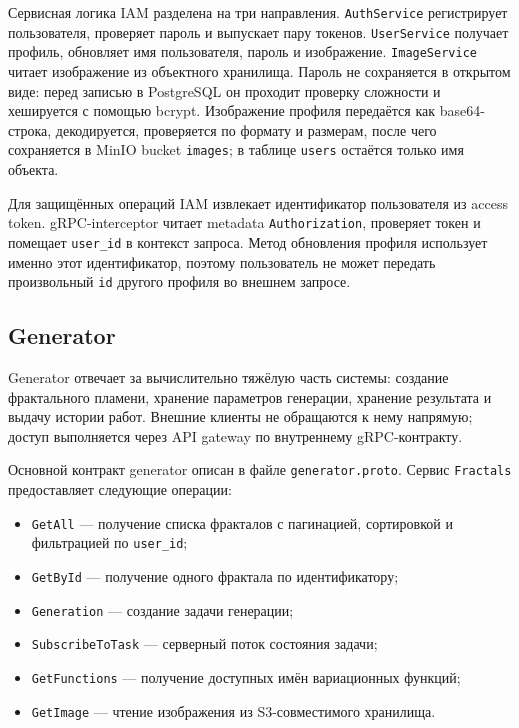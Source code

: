 Сервисная логика IAM разделена на три направления. \texttt{AuthService} регистрирует пользователя, проверяет пароль и выпускает пару токенов. \texttt{UserService} получает профиль, обновляет имя пользователя, пароль и изображение. \texttt{ImageService} читает изображение из объектного хранилища. Пароль не сохраняется в открытом виде: перед записью в PostgreSQL он проходит проверку сложности и хешируется с помощью bcrypt. Изображение профиля передаётся как base64-строка, декодируется, проверяется по формату и размерам, после чего сохраняется в MinIO bucket \texttt{images}; в таблице \texttt{users} остаётся только имя объекта.

Для защищённых операций IAM извлекает идентификатор пользователя из access token. gRPC-interceptor читает metadata \texttt{Authorization}, проверяет токен и помещает \texttt{user\_id} в контекст запроса. Метод обновления профиля использует именно этот идентификатор, поэтому пользователь не может передать произвольный \texttt{id} другого профиля во внешнем запросе.

\subsection{Generator}

Generator отвечает за вычислительно тяжёлую часть системы: создание фрактального пламени, хранение параметров генерации, хранение результата и выдачу истории работ. Внешние клиенты не обращаются к нему напрямую; доступ выполняется через API gateway по внутреннему gRPC-контракту.

Основной контракт generator описан в файле \texttt{generator.proto}. Сервис \texttt{Fractals} предоставляет следующие операции:
\begin{itemize}
  \item \texttt{GetAll} --- получение списка фракталов с пагинацией, сортировкой и фильтрацией по \texttt{user\_id};
  \item \texttt{GetById} --- получение одного фрактала по идентификатору;
  \item \texttt{Generation} --- создание задачи генерации;
  \item \texttt{SubscribeToTask} --- серверный поток состояния задачи;
  \item \texttt{GetFunctions} --- получение доступных имён вариационных функций;
  \item \texttt{GetImage} --- чтение изображения из S3-совместимого хранилища.
\end{itemize}

